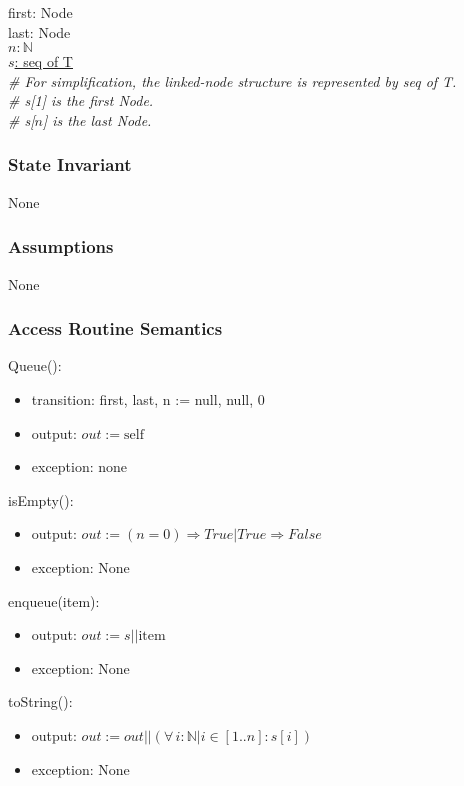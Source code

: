 \documentclass[12pt]{article}
\begin{document}
first: Node\\
last: Node\\
$n: \mathbb{N}$\\
\underline{$s$: seq of T}\\

\noindent \textit{\# For simplification, the linked-node structure is represented by seq of T.}\\
\noindent \textit{\# s[1] is the first Node.}\\
\noindent \textit{\# s[$n$] is the last Node.}

\subsubsection* {State Invariant}

None

\subsubsection* {Assumptions}

None

\subsubsection* {Access Routine Semantics}

\noindent Queue():
\begin{itemize}
\item transition: first, last, n := null, null, 0
\item output: $out := \mbox{self}$
\item exception: none
\end{itemize}

\noindent isEmpty():
\begin{itemize}
\item output: $out := (n = 0) \Rightarrow True | True \Rightarrow False$
\item exception: None
\end{itemize}

\noindent enqueue(item):
\begin{itemize}
\item output: $out := s || \mbox{item}$
\item exception: None
\end{itemize}

\noindent toString():
\begin{itemize}
\item output: $out := out || (\forall\, i: \mathbb{N}| i\in[1..n] : s[i])$
\item exception: None
\end{itemize}
\end{document}
